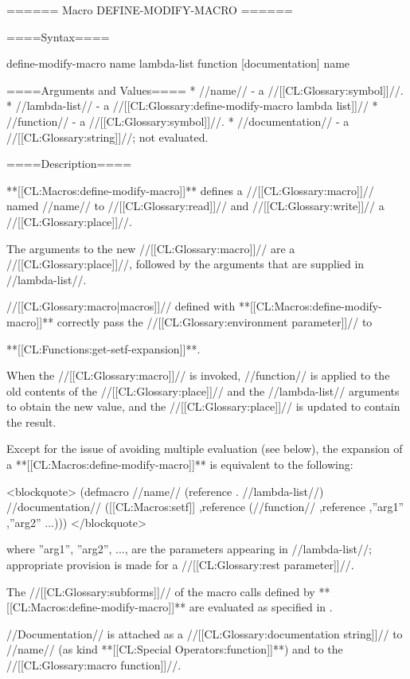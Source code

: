 ====== Macro DEFINE-MODIFY-MACRO ======

====Syntax====

\DefmacWithValues define-modify-macro {name lambda-list function [documentation]} {name}

====Arguments and Values====
  * //name// - a //[[CL:Glossary:symbol]]//.
  * //lambda-list// - a //[[CL:Glossary:define-modify-macro lambda list]]//
  * //function// - a //[[CL:Glossary:symbol]]//.
  * //documentation// - a //[[CL:Glossary:string]]//; not evaluated.

====Description====

**[[CL:Macros:define-modify-macro]]** defines a //[[CL:Glossary:macro]]// named //name// to //[[CL:Glossary:read]]// and //[[CL:Glossary:write]]// a //[[CL:Glossary:place]]//.

The arguments to the new //[[CL:Glossary:macro]]// are a //[[CL:Glossary:place]]//, followed by the arguments that are supplied in //lambda-list//.

//[[CL:Glossary:macro|macros]]// defined with **[[CL:Macros:define-modify-macro]]** correctly pass the //[[CL:Glossary:environment parameter]]// to

**[[CL:Functions:get-setf-expansion]]**.

When the //[[CL:Glossary:macro]]// is invoked, //function// is applied to the old contents of the //[[CL:Glossary:place]]// and the //lambda-list// arguments to obtain the new value, and the //[[CL:Glossary:place]]// is updated to contain the result.

Except for the issue of avoiding multiple evaluation (see below), the expansion of a **[[CL:Macros:define-modify-macro]]** is equivalent to the following:

<blockquote> (defmacro //name// (reference . //lambda-list//) //documentation// \bq([[CL:Macros:setf]] ,reference (//function// ,reference ,''arg1'' ,''arg2'' ...))) </blockquote>

where ''arg1'', ''arg2'', ..., are the parameters appearing in //lambda-list//; appropriate provision is made for a //[[CL:Glossary:rest parameter]]//.

The //[[CL:Glossary:subforms]]// of the macro calls defined by **[[CL:Macros:define-modify-macro]]** are evaluated as specified in \secref\GenRefSubFormEval.

//Documentation// is attached as a //[[CL:Glossary:documentation string]]// to //name// (as kind **[[CL:Special Operators:function]]**) and to the //[[CL:Glossary:macro function]]//.

